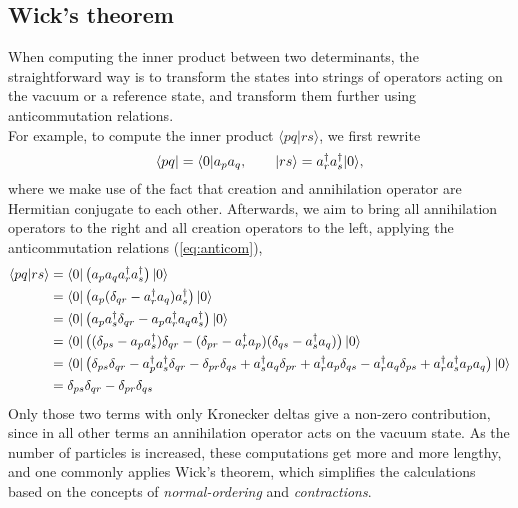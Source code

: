\subsection{Wick's theorem}
When computing the inner product between two determinants, the straightforward way is to transform the states into strings of operators acting on the vacuum or a reference state, and transform them further using anticommutation relations.\\
For example, to compute the inner product $\langle pq|rs\rangle$, we first rewrite
\[
\langle pq| = \langle 0|a_p a_q, \qquad |rs\rangle = a^{\dagger}_r a^{\dagger}_s |0\rangle,
\]
where we make use of the fact that creation and annihilation operator are Hermitian conjugate to each other. Afterwards, we aim to bring all annihilation operators to the right and all creation operators to the left, applying the anticommutation relations (\ref{eq:anticom}), 
\begin{align*}
\langle pq|rs\rangle &= \langle 0|\left( a_p a_q a^{\dagger}_r a^{\dagger}_s \right)|0\rangle \\
&= \langle 0 | \left( a_p (\delta_{qr}-a^{\dagger}_r a_q)a^{\dagger}_s \right) | 0 \rangle \\
&= \langle 0 | \left( a_p a^{\dagger}_s \delta_{qr} - a_p a^{\dagger}_r a_q a^{\dagger}_s \right) | 0 \rangle \\
&= \langle 0 | \left( (\delta_{ps} - a_pa^{\dagger}_s) \delta_{qr} - (\delta_{pr} - a^{\dagger}_r a_p)(\delta_{qs}-a^{\dagger}_s a_q) \right) |0\rangle \\
&= \langle 0 | \left( \delta_{ps}\delta_{qr} - a^{\dagger}_pa^{\dagger}_s\delta_{qr} - \delta_{pr}\delta_{qs} + a^{\dagger}_s a_q \delta_{pr} + a^{\dagger}_r a_p \delta_{qs} - a^{\dagger}_r a_q \delta_{ps} + a^{\dagger}_r a^{\dagger}_s a_p a_q \right) | 0 \rangle \\
&= \delta_{ps}\delta_{qr} - \delta_{pr}\delta_{qs}
\end{align*}
Only those two terms with only Kronecker deltas give a non-zero contribution, since in all other terms an annihilation operator acts on the vacuum state. As the number of particles is increased, these computations get more and more lengthy, and one commonly applies Wick's theorem, which simplifies the calculations based on the concepts of \textit{normal-ordering} and \textit{contractions}.

